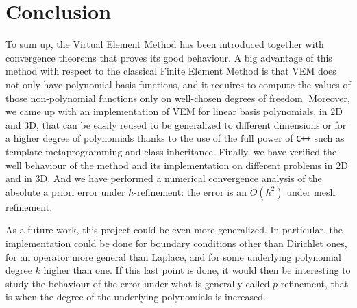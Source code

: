 \newpage
\section{Conclusion}

To sum up, the Virtual Element Method has been introduced together with convergence theorems that proves its good behaviour. A big advantage of this method with respect to the classical Finite Element Method is that VEM does not only have polynomial basis functions, and it requires to compute the values of those non-polynomial functions only on well-chosen degrees of freedom. Moreover, we came up with an implementation of VEM for linear basis polynomials, in $2$D and $3$D, that can be easily reused to be generalized to different dimensions or for a higher degree of polynomials thanks to the use of the full power of \verb!C++! such as template metaprogramming and class inheritance. Finally, we have verified the well behaviour of the method and its implementation on different problems in $2$D and in $3$D. And we have performed a numerical convergence analysis of the absolute a priori error under $h$-refinement: the error is an $O(h^2)$ under mesh refinement. 

As a future work, this project could be even more generalized. In particular, the implementation could be done for boundary conditions other than Dirichlet ones, for an operator more general than Laplace, and for some underlying polynomial degree $k$ higher than one. If this last point is done, it would then be interesting to study the behaviour of the error under what is generally called $p$-refinement, that is when the degree of the underlying polynomials is increased. 
